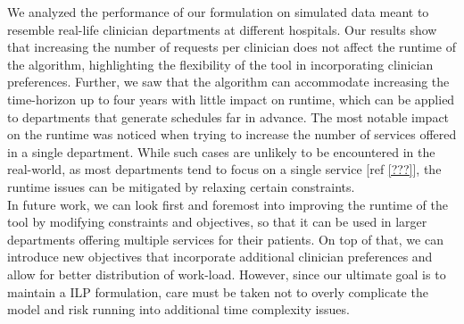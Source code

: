 We analyzed the performance of our formulation on simulated data meant to resemble real-life clinician departments at different hospitals. Our results show that increasing the number of requests per clinician does not affect the runtime of the algorithm, highlighting the flexibility of the tool in incorporating clinician preferences. Further, we saw that the algorithm can accommodate increasing the time-horizon up to four years with little impact on runtime, which can be applied to departments that generate schedules far in advance. The most notable impact on the runtime was noticed when trying to increase the number of services offered in a single department. While such cases are unlikely to be encountered in the real-world, as most departments tend to focus on a single service [ref \ref{???}], the runtime issues can be mitigated by relaxing certain constraints. \\

In future work, we can look first and foremost into improving the runtime of the tool by modifying constraints and objectives, so that it can be used in larger departments offering multiple services for their patients. On top of that, we can introduce new objectives that incorporate additional clinician preferences and allow for better distribution of work-load. However, since our ultimate goal is to maintain a ILP formulation, care must be taken not to overly complicate the model and risk running into additional time complexity issues.